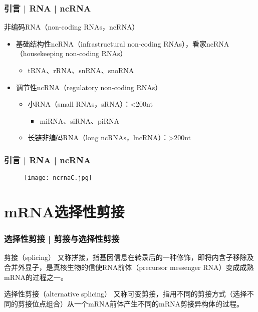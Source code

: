\begin{frame}
  \frametitle{引言 | RNA | ncRNA}
  \begin{block}{非编码RNA（non-coding RNAs，ncRNA）}
  \begin{itemize}
    \item 基础结构性ncRNA（infrastructural non-coding RNAs），看家ncRNA（housekeeping non-coding RNAs）
      \begin{itemize}
        \item tRNA、rRNA、snRNA、snoRNA
      \end{itemize}
    \item 调节性ncRNA（regulatory non-coding RNAs）
      \begin{itemize}
        \item 小RNA（small RNAs，sRNA）：\textless 200nt
          \begin{itemize}
            \item miRNA、siRNA、piRNA
          \end{itemize}
        \item 长链非编码RNA（long ncRNAs，lncRNA）：\textgreater 200nt
      \end{itemize}
  \end{itemize}
\end{block}
\end{frame}

\begin{frame}
  \frametitle{引言 | RNA | ncRNA}
  \begin{figure}
    \centering
    \texttt{[image: ncrnaC.jpg]}
  \end{figure}
\end{frame}

\section{mRNA选择性剪接}
\begin{frame}
  \frametitle{选择性剪接 | 剪接与选择性剪接}
  \begin{block}{剪接（splicing）}
    又称拼接，指基因信息在转录后的一种修饰，即将内含子移除及合并外显子，是真核生物的信使RNA前体（precursor messenger RNA）变成成熟mRNA的过程之一。
  \end{block}
  \pause
  \begin{block}{选择性剪接（alternative splicing）}
    又称可变剪接，指用不同的剪接方式（选择不同的剪接位点组合）从一个mRNA前体产生不同的mRNA剪接异构体的过程。
  \end{block}
\end{frame}

